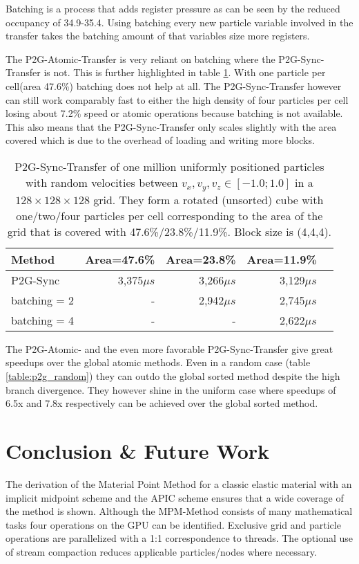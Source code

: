 \documentclass[m,times]{cgMA}
\begin{document}
Batching is a process that adds register pressure as can be seen by the reduced occupancy of 34.9-35.4. Using batching every new particle variable involved in the transfer takes the batching amount of that variables size more registers.

The P2G-Atomic-Transfer is very reliant on batching where the P2G-Sync-Transfer is not. This is further highlighted in table \ref{table:p2g_area}. With one particle per cell(area 47.6\%) batching does not help at all. The P2G-Sync-Transfer however can still work comparably fast to either the high density of four particles per cell losing about 7.2\% speed or atomic operations because batching is not available. This also means that the P2G-Sync-Transfer only scales slightly with the area covered which is due to the overhead of loading and writing more blocks.

\begin{table}[htpb]
  \begin{tabular}{ | l | r | r | r | r |}    \hline
    Method                 &  Area=47.6\% & Area=23.8\% &Area=11.9\%\\\hline
    P2G-Sync		   &  3,375$\mu s$& 3,266$\mu s$ & 3,129$\mu s$\\\hline
    batching = 2           & -&2,942$\mu s$ & 2,745$\mu s$\\\hline
    batching = 4           & -&- &2,622$\mu s$\\\hline
 \end{tabular}
 \caption{P2G-Sync-Transfer of one million uniformly positioned particles with random velocities between $v_x,v_y,v_z \in [-1.0;1.0]$ in a $128\times 128\times128$ grid. They form a rotated (unsorted) cube with one/two/four particles per cell corresponding to the area of the grid that is covered with 47.6\%/23.8\%/11.9\%. Block size is (4,4,4).}
 \label{table:p2g_area}
\end{table}
The P2G-Atomic- and the even more favorable P2G-Sync-Transfer give great speedups over the global atomic methods. Even in a random case (table \ref{table:p2g_random}) they can outdo the global sorted method despite the high branch divergence. They however shine in the uniform case where speedups of 6.5x and 7.8x respectively can be achieved over the global sorted method.
\clearpage
\section{Conclusion \& Future Work}\label{sec:conclusion}
The derivation of the Material Point Method for a classic elastic material with an implicit midpoint scheme and the APIC scheme ensures that a wide coverage of the method is shown. Although the MPM-Method consists of many mathematical tasks four operations on the GPU can be identified. Exclusive grid and particle operations are parallelized with a 1:1 correspondence to threads. The optional use of stream compaction reduces applicable particles/nodes where necessary.
\end{document}
